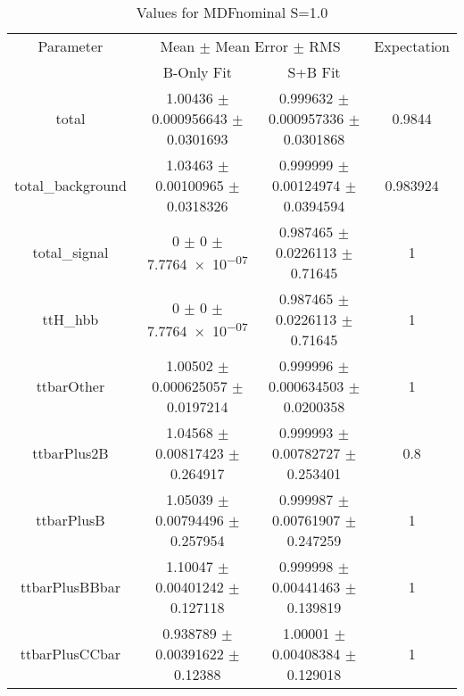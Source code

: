 \begin{table}
\centering
\caption{Values for MDFnominal S=1.0}
\begin{tabular}{cccc}
\toprule
Parameter & \multicolumn{2}{c}{Mean $\pm$ Mean Error $\pm$ RMS} & Expectation\\
 & B-Only Fit & S+B Fit & \\
\midrule
total & \num{1.00436} $\pm$ \num{0.000956643} $\pm$ \num{0.0301693} & \num{0.999632} $\pm$ \num{0.000957336} $\pm$ \num{0.0301868} & \num{0.9844}\\
total\_background & \num{1.03463} $\pm$ \num{0.00100965} $\pm$ \num{0.0318326} & \num{0.999999} $\pm$ \num{0.00124974} $\pm$ \num{0.0394594} & \num{0.983924}\\
total\_signal & \num{0} $\pm$ \num{0} $\pm$ \num{7.7764e-07} & \num{0.987465} $\pm$ \num{0.0226113} $\pm$ \num{0.71645} & \num{1}\\
ttH\_hbb & \num{0} $\pm$ \num{0} $\pm$ \num{7.7764e-07} & \num{0.987465} $\pm$ \num{0.0226113} $\pm$ \num{0.71645} & \num{1}\\
ttbarOther & \num{1.00502} $\pm$ \num{0.000625057} $\pm$ \num{0.0197214} & \num{0.999996} $\pm$ \num{0.000634503} $\pm$ \num{0.0200358} & \num{1}\\
ttbarPlus2B & \num{1.04568} $\pm$ \num{0.00817423} $\pm$ \num{0.264917} & \num{0.999993} $\pm$ \num{0.00782727} $\pm$ \num{0.253401} & \num{0.8}\\
ttbarPlusB & \num{1.05039} $\pm$ \num{0.00794496} $\pm$ \num{0.257954} & \num{0.999987} $\pm$ \num{0.00761907} $\pm$ \num{0.247259} & \num{1}\\
ttbarPlusBBbar & \num{1.10047} $\pm$ \num{0.00401242} $\pm$ \num{0.127118} & \num{0.999998} $\pm$ \num{0.00441463} $\pm$ \num{0.139819} & \num{1}\\
ttbarPlusCCbar & \num{0.938789} $\pm$ \num{0.00391622} $\pm$ \num{0.12388} & \num{1.00001} $\pm$ \num{0.00408384} $\pm$ \num{0.129018} & \num{1}\\
\bottomrule
\end{tabular}
\end{table}